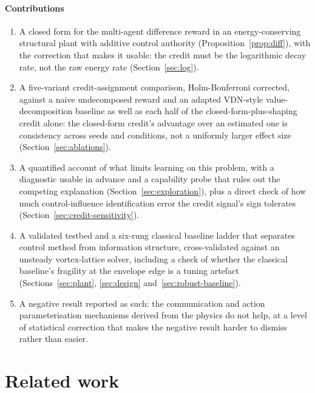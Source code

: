 \documentclass[preprint,11pt]{elsarticle}
\begin{document}
\paragraph{Contributions}
\begin{enumerate}
\item A closed form for the multi-agent difference reward in an
energy-conserving structural plant with additive control authority
(Proposition~\ref{prop:diff}), with the correction that makes it usable: the
credit must be the logarithmic decay rate, not the raw energy rate
(Section~\ref{sec:log}).
\item A five-variant credit-assignment comparison, Holm-Bonferroni corrected,
against a naive undecomposed reward and an adapted VDN-style
value-decomposition baseline as well as each half of the
closed-form-plus-shaping credit alone: the closed-form credit's advantage
over an estimated one is consistency across seeds and conditions, not a
uniformly larger effect size (Section~\ref{sec:ablations}).
\item A quantified account of what limits learning on this problem, with a
diagnostic usable in advance and a capability probe that rules out the
competing explanation (Section~\ref{sec:exploration}), plus a direct check of
how much control-influence identification error the credit signal's sign
tolerates (Section~\ref{sec:credit-sensitivity}).
\item A validated testbed and a six-rung classical baseline ladder that
separates control method from information structure, cross-validated
against an unsteady vortex-lattice solver, including a check of whether the
classical baseline's fragility at the envelope edge is a tuning artefact
(Sections~\ref{sec:plant}, \ref{sec:design} and~\ref{sec:robust-baseline}).
\item A negative result reported as such: the communication and action
parameterisation mechanisms derived from the physics do not help, at a
level of statistical correction that makes the negative result harder to
dismiss rather than easier.
\end{enumerate}

\section{Related work}
\label{sec:related}
\end{document}
